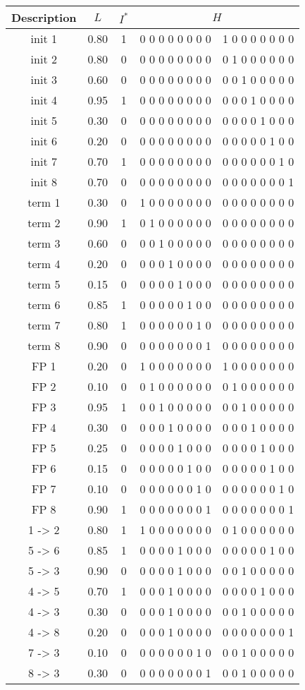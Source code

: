 \documentclass[10pt]{article}
\begin{document}
\begin{longtable}[c]{@{}ccccc@{}}
Description & $L$ & $I^*$ & \multicolumn{2}{c}{$H$}\tabularnewline
\hline
\rowcolor{Gray}
init 1 & 0.80 & 1 & 0 0 0 0 0 0 0 0 & 1 0 0 0 0 0 0 0\tabularnewline
init 2 & 0.80 & 0 & 0 0 0 0 0 0 0 0 & 0 1 0 0 0 0 0 0\tabularnewline
init 3 & 0.60 & 0 & 0 0 0 0 0 0 0 0 & 0 0 1 0 0 0 0 0\tabularnewline
\rowcolor{Gray}
init 4 & 0.95 & 1 & 0 0 0 0 0 0 0 0 & 0 0 0 1 0 0 0 0\tabularnewline
init 5 & 0.30 & 0 & 0 0 0 0 0 0 0 0 & 0 0 0 0 1 0 0 0\tabularnewline
init 6 & 0.20 & 0 & 0 0 0 0 0 0 0 0 & 0 0 0 0 0 1 0 0\tabularnewline
\rowcolor{Gray}
init 7 & 0.70 & 1 & 0 0 0 0 0 0 0 0 & 0 0 0 0 0 0 1 0\tabularnewline
init 8 & 0.70 & 0 & 0 0 0 0 0 0 0 0 & 0 0 0 0 0 0 0 1\tabularnewline
term 1 & 0.30 & 0 & 1 0 0 0 0 0 0 0 & 0 0 0 0 0 0 0 0\tabularnewline
\rowcolor{Gray}
term 2 & 0.90 & 1 & 0 1 0 0 0 0 0 0 & 0 0 0 0 0 0 0 0\tabularnewline
term 3 & 0.60 & 0 & 0 0 1 0 0 0 0 0 & 0 0 0 0 0 0 0 0\tabularnewline
term 4 & 0.20 & 0 & 0 0 0 1 0 0 0 0 & 0 0 0 0 0 0 0 0\tabularnewline
term 5 & 0.15 & 0 & 0 0 0 0 1 0 0 0 & 0 0 0 0 0 0 0 0\tabularnewline
\rowcolor{Gray}
term 6 & 0.85 & 1 & 0 0 0 0 0 1 0 0 & 0 0 0 0 0 0 0 0\tabularnewline
\rowcolor{Gray}
term 7 & 0.80 & 1 & 0 0 0 0 0 0 1 0 & 0 0 0 0 0 0 0 0\tabularnewline
term 8 & 0.90 & 0 & 0 0 0 0 0 0 0 1 & 0 0 0 0 0 0 0 0\tabularnewline
FP 1 & 0.20 & 0 & 1 0 0 0 0 0 0 0 & 1 0 0 0 0 0 0 0\tabularnewline
FP 2 & 0.10 & 0 & 0 1 0 0 0 0 0 0 & 0 1 0 0 0 0 0 0\tabularnewline
\rowcolor{Gray}
FP 3 & 0.95 & 1 & 0 0 1 0 0 0 0 0 & 0 0 1 0 0 0 0 0\tabularnewline
FP 4 & 0.30 & 0 & 0 0 0 1 0 0 0 0 & 0 0 0 1 0 0 0 0\tabularnewline
FP 5 & 0.25 & 0 & 0 0 0 0 1 0 0 0 & 0 0 0 0 1 0 0 0\tabularnewline
FP 6 & 0.15 & 0 & 0 0 0 0 0 1 0 0 & 0 0 0 0 0 1 0 0\tabularnewline
FP 7 & 0.10 & 0 & 0 0 0 0 0 0 1 0 & 0 0 0 0 0 0 1 0\tabularnewline
\rowcolor{Gray}
FP 8 & 0.90 & 1 & 0 0 0 0 0 0 0 1 & 0 0 0 0 0 0 0 1\tabularnewline
1 -\textgreater{} 2 & 0.80 & 1 & 1 0 0 0 0 0 0 0 & 0 1 0 0 0 0 0
0\tabularnewline
5 -\textgreater{} 6 & 0.85 & 1 & 0 0 0 0 1 0 0 0 & 0 0 0 0 0 1 0
0\tabularnewline
5 -\textgreater{} 3 & 0.90 & 0 & 0 0 0 0 1 0 0 0 & 0 0 1 0 0 0 0
0\tabularnewline
\rowcolor{Gray}
4 -\textgreater{} 5 & 0.70 & 1 & 0 0 0 1 0 0 0 0 & 0 0 0 0 1 0 0
0\tabularnewline
4 -\textgreater{} 3 & 0.30 & 0 & 0 0 0 1 0 0 0 0 & 0 0 1 0 0 0 0
0\tabularnewline
4 -\textgreater{} 8 & 0.20 & 0 & 0 0 0 1 0 0 0 0 & 0 0 0 0 0 0 0
1\tabularnewline
7 -\textgreater{} 3 & 0.10 & 0 & 0 0 0 0 0 0 1 0 & 0 0 1 0 0 0 0
0\tabularnewline
8 -\textgreater{} 3 & 0.30 & 0 & 0 0 0 0 0 0 0 1 & 0 0 1 0 0 0 0
0\tabularnewline
\end{longtable}
\end{document}
